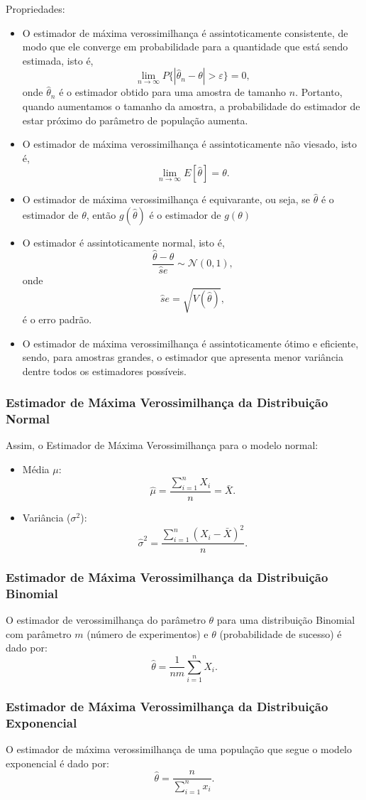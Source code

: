 \documentclass{article}
\begin{document}
Propriedades:
\begin{itemize}
    \item O estimador de máxima verossimilhança é assintoticamente consistente, de modo que ele converge em probabilidade para a quantidade que está sendo estimada, isto é,
        $$
        \lim_{n \to \infty} P\{|\hat{\theta}_n - \theta| > \varepsilon\} = 0,
        $$
    onde $\hat{\theta}_n$ é o estimador obtido para uma amostra de tamanho $n$. Portanto, quando aumentamos o tamanho da amostra, a probabilidade do estimador de estar próximo do parâmetro de população aumenta.
    \item O estimador de máxima verossimilhança é assintoticamente não viesado, isto é,
        $$
        \lim_{n \to \infty} E[\hat{\theta}] = \theta.
        $$
    \item O estimador de máxima verossimilhança é equivarante, ou seja, se $\hat{\theta}$ é o estimador de $\theta$, então $g(\hat{\theta})$ é o estimador de $g(\theta)$
    \item O estimador é assintoticamente normal, isto é,
        $$
        \frac{\hat{\theta} - \theta}{\hat{s}e} \sim \mathcal{N}(0,1),
        $$
    onde
        $$
        \hat{s}e = \sqrt{V(\hat{\theta})},
        $$
    é o erro padrão.
    \item O estimador de máxima verossimilhança é assintoticamente ótimo e eficiente, sendo, para amostras grandes, o estimador que apresenta menor variância dentre todos os estimadores possíveis.
\end{itemize}

\subsubsection{Estimador de Máxima Verossimilhança da Distribuição Normal}
Assim, o Estimador de Máxima Verossimilhança para o modelo normal:
\begin{itemize}
    \item Média $\mu$:
    $$
    \hat{\mu} = \frac{\sum_{i=1}^n X_i}{n} = \bar{X}.
    $$
    \item Variância ($\sigma^2$):
    $$
    \hat{\sigma}^2 = \frac{\sum_{i=1}^n (X_i - \bar{X})^2}{n}.
    $$
\end{itemize}

\subsubsection{Estimador de Máxima Verossimilhança da Distribuição Binomial}
O estimador de verossimilhança do parâmetro $\theta$ para uma distribuição Binomial com parâmetro $m$ (número de experimentos) e $\theta$ (probabilidade de sucesso) é dado por:
    $$
    \hat{\theta} = \frac{1}{nm} \sum_{i=1}^n X_i.
    $$
    
\subsubsection{Estimador de Máxima Verossimilhança da Distribuição Exponencial}
O estimador de máxima verossimilhança de uma população que segue o modelo exponencial é dado por:
    $$
    \hat{\theta} = \frac{n}{\sum_{i=1}^n x_i}.
    $$
    
\end{document}
